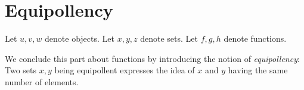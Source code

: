 \documentclass[../../set-theory.ftl.tex]{subfiles}
\begin{document}
  \section{Equipollency}

  \begin{forthel}
  \end{forthel}

  \begin{forthel}
    Let $u,v,w$ denote objects.
    Let $x,y,z$ denote sets.
    Let $f,g,h$ denote functions.
  \end{forthel}

  \noindent We conclude this part about functions by introducing the notion of
  \textit{equipollency}:
  Two sets $x,y$ being equipollent expresses the idea of $x$ and $y$ having the
  same number of elements.
\end{document}
